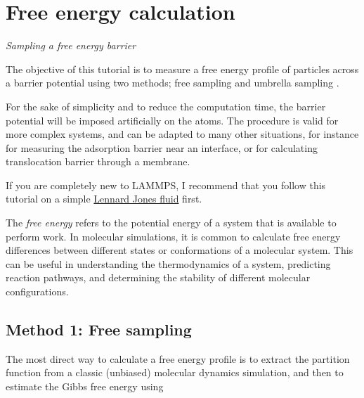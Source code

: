 \chapter{Free energy calculation}
\label{umbrella-sampling-label}

\noindent \vspace{-1cm} \noindent \textcolor{graytitle}{\textit{{\Large Sampling a free energy barrier}}\vspace{0.5cm} }

\vspace{0.25cm} \noindent The objective of this tutorial is to measure a free
energy profile of particles across a barrier potential
using two methods; free sampling
and umbrella sampling \cite{frenkel2023understanding}.

\vspace{0.25cm} \noindent For the sake of simplicity and to reduce the computation time, the
barrier potential will be imposed artificially on the atoms.
The procedure is valid for more complex
systems, and can be adapted to many other situations, for instance 
for measuring the adsorption barrier near an interface, or for calculating
translocation barrier through a membrane.

\vspace{0.25cm} \noindent If you are completely new to LAMMPS, I recommend that
you follow this tutorial on a simple \hyperref[lennard-jones-label]{Lennard Jones fluid} first.

\begin{tcolorbox}[colback=mylightblue!5!white,colframe=mylightblue!75!black,title=What is free energy]

\vspace{0.25cm} \noindent The \textit{free energy} refers to the potential energy of a system that
is available to perform work. In molecular simulations, it is
common to calculate free energy differences between different states
or conformations of a molecular system. This can be useful in understanding
the thermodynamics of a system, predicting reaction pathways, and
determining the stability of different molecular configurations.
\end{tcolorbox}

\noindent \section{Method 1: Free sampling}
The most direct way to calculate a free energy profile is to extract
the partition function from a classic (unbiased) molecular
dynamics simulation, and then to estimate the Gibbs free
energy using 

